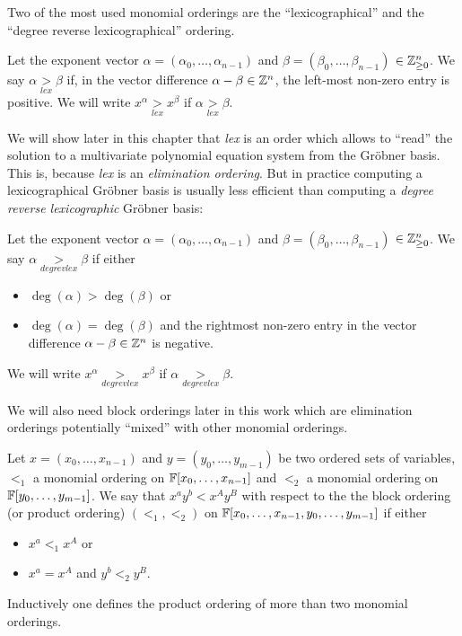 Two of the most used monomial orderings are the ``lexicographical'' and the ``degree reverse lexicographical'' ordering.

\begin{definition}
\label{def:lex}
Let the exponent vector $\alpha = (\alpha_0, \dots, \alpha_{n-1})$ and $\beta = (\beta_0, \dots, \beta_{n-1})$ $\in \mathbb{Z}_{\geq 0}^n$. We say
$\alpha \underset{lex}{>} \beta$ if, in the vector difference $\alpha - \beta \in \mathbb{Z}^n$, the left-most non-zero entry is positive.
We will write $x^\alpha \underset{lex}{>} x^\beta$ if $\alpha \underset{lex}{>} \beta$. 
\end{definition}

We will show later in this chapter that \emph{lex} is an order which allows to ``read'' the solution to a multivariate polynomial equation system from the Gröbner basis. This is, because \emph{lex} is an \emph{elimination ordering}. But in practice computing a lexicographical Gröbner basis is usually less efficient than computing a \emph{degree reverse lexicographic} Gröbner basis:

\begin{definition} 
\label{def:degrevlex}
Let the exponent vector $\alpha = (\alpha_0, \dots, \alpha_{n-1})$ and $\beta = (\beta_0, \dots, \beta_{n-1})$ $\in \mathbb{Z}_{\geq 0}^n$.
We say $\alpha \underset{degrevlex}{>} \beta$ if either
\begin{itemize}
 \item $\deg( \alpha ) > \deg(\beta )$  or
 \item $\deg(\alpha) = \deg(\beta)$ and the rightmost non-zero entry in the vector difference $\alpha - \beta \in \mathbb{Z}^n$ is negative.
\end{itemize}
We will write $x^\alpha \underset{degrevlex}{>} x^\beta$ if $\alpha \underset{degrevlex}{>} \beta$.
\end{definition}

We will also need block orderings later in this work which are elimination orderings potentially ``mixed'' with other monomial orderings.

\begin{definition} 
\label{def:blockorder}
Let $x = (x_0, \ldots, x_{n-1})$ and  $y = (y_0, \ldots, y_{m-1})$ be two ordered sets of variables, $<_1$ a monomial ordering on $\mathbb{F}[x_0,\dots,x_{n-1}]$ and $<_2$ a monomial ordering on $\mathbb{F}[y_0,\dots,y_{m-1}]$. We say that $x^a y^b < x^A y^B$ with respect to the the block ordering (or product ordering) $(<_1,<_2)$ on $\mathbb{F}[x_0,\dots,x_{n-1},y_0,\dots,y_{m-1}]$ if either

\begin{itemize}
 \item $x^a <_1 x^A$  or 
 \item $x^a = x^A$ and $y^b <_2 y^B$.
\end{itemize}

Inductively one defines the product ordering of more than two monomial orderings.
\end{definition}

